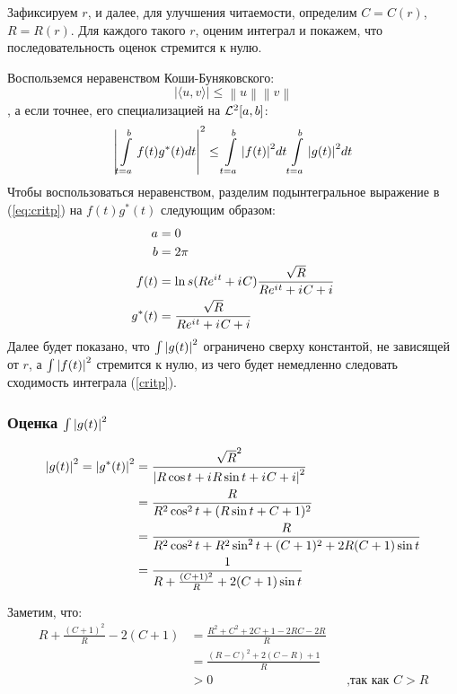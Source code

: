 
Зафиксируем $r$, и далее, для улучшения читаемости, определим $C = C(r)$, $R = R(r)$. Для каждого такого $r$, оценим интеграл и покажем, что последовательность оценок стремится к нулю.

Воспольземся неравенством Коши-Буняковского:
\[
\big| \langle u,v \rangle \big| \leq \left\|u\right\| \left\|v\right\|
\]
, а если точнее, его специализацией на $\mathcal{L}^2[a, b]$:
\[
\abs{
\int\limits_{t=a}^{b} f(t) g^*(t) dt
}^2
\le
\int\limits_{t=a}^b \abs{f(t)}^2 dt 
\int\limits_{t=a}^b \abs{g(t)}^2 dt 
\]
% 
Чтобы воспользоваться неравенством, разделим подынтегральное выражение в (\ref{eq:critp}) на $f(t) g^*(t)$ следующим образом:
\begin{equation*}
\begin{aligned}
a      &= 0 \\
b      &= 2 \pi \\
f(t)   &= \ln s(R e^{{i\mkern1mu} t} + {i\mkern1mu} C) \frac{\sqrt{R}}{R e^{{i\mkern1mu} t} + {i\mkern1mu} C + i} \\
g^*(t) &= \frac{\sqrt{R}}{R e^{{i\mkern1mu} t} + {i\mkern1mu} C + i}
\end{aligned}
\end{equation*}
Далее будет показано, что $\int \abs{g(t)}^2$ ограничено сверху константой, не зависящей от $r$, а $\int \abs{f(t)}^2$ стремится к нулю, из чего будет немедленно следовать сходимость интеграла (\ref{critp}).

\subsubsection{Оценка $\int \abs{g(t)}^2$}

\begin{align*}
\abs{g(t)}^2 = \abs{g^*(t)}^2
&=   \frac{\sqrt{R}^2}{\abs{R \cos t + {i\mkern1mu} R \sin t + {i\mkern1mu} C + i}^2} \\
&=   \frac{R}{R^2 \cos^2 t + (R \sin t + C + 1)^2} \\
&= \frac{R}{R^2 \cos^2 t + R^2 \sin^2 t + (C + 1)^2  + 2 R (C + 1) \sin t} \\
&=   \frac{1}{R + \frac{(C + 1)^2}{R} + 2 (C + 1) \sin t} \\ 
\end{align*}

Заметим, что:
\begin{align*}
   R + \frac{(C + 1)^2}{R} - 2 (C + 1)
   &= \frac{R^2 + C^2 + 2C + 1 - 2 RC - 2 R}{R}
\\ &= \frac{(R - C)^2 + 2(C - R) + 1}{R}
\\ &> 0 && \text{,так как $C > R$} 
\end{align*}

